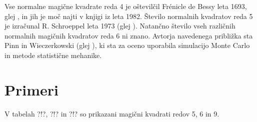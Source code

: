 \documentclass[a4paper,12pt]{article}
\theoremstyle{definition}
\theoremstyle{plain}
\begin{document}
Vse normalne magične kvadrate reda 4 je oštevilčil Frénicle de Bessy
leta 1693, glej \cite{Bessy}, in jih je moč najti v knjigi \cite{Berlekamp}
iz leta 1982. Število normalnih kvadratov reda 5 je izračunal
R. Schroeppel leta 1973 (glej \cite{Gardner}).
Natančno število vseh različnih normalnih magičnih kvadratov reda 6 ni znano.
Avtorja navedenega približka sta Pinn in Wieczerkowski (glej \cite{Pinn}), ki
sta za oceno uporabila simulacijo Monte Carlo in metode statistične mehanike.


\section{Primeri}

V tabelah ?!?, ?!? in ?!? so prikazani
magični kvadrati redov 5, 6 in 9.





\newpage





\end{document}
